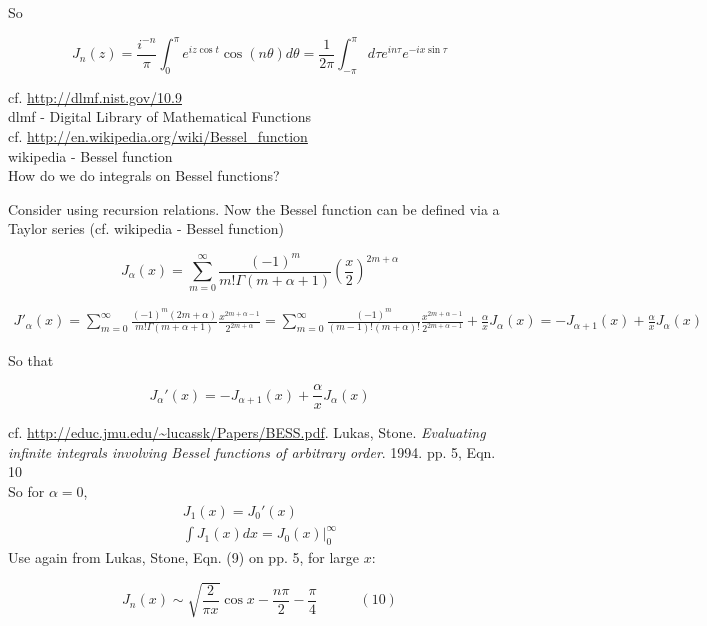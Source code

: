\documentclass[twoside]{amsart}
\begin{document}
So 

\[
\boxed{ J_n(z) = \frac{i^{-n} }{ \pi } \int_0^{\pi} e^{iz \cos{t}  } \cos{ (n \theta ) } d\theta = \frac{1}{2 \pi} \int_{-\pi}^{ \pi} d\tau e^{in\tau } e^{-ix \sin{\tau } } }
\]

cf. \url{ http://dlmf.nist.gov/10.9 } \\
dlmf - Digital Library of Mathematical Functions \\

cf. \url{http://en.wikipedia.org/wiki/Bessel_function} \\
wikipedia - Bessel function \\

How do we do integrals on Bessel functions?

Consider using recursion relations.  Now the Bessel function can be defined via a Taylor series (cf. wikipedia - Bessel function)

\[
J_{\alpha}(x)  = \sum_{m=0}^{\infty} \frac{ (-1)^m }{ m! \Gamma{ (m+ \alpha + 1 ) } } \left( \frac{x}{2} \right)^{ 2m + \alpha }
\]

\[
\begin{gathered}
  J'_{\alpha}(x) = \sum_{m=0}^{\infty} \frac{ (-1)^m  ( 2m+ \alpha ) }{ m! \Gamma{ (m+\alpha + 1) } } \frac{ x^{2m + \alpha - 1 } }{ 2^{2m + \alpha } } = \sum_{m=0}^{\infty} \frac{ (-1)^m }{  (m-1)! (m+\alpha)! } \frac{x^{ 2m + \alpha - 1 }  }{ 2^{2m + \alpha - 1 } } + \frac{\alpha}{x} J_{\alpha}{(x)}  = -J_{\alpha + 1}(x) + \frac{\alpha}{x} J_{\alpha}(x)
\end{gathered}
\]

So that 

\[
\boxed{ J_{\alpha}'(x) = -J_{\alpha + 1}(x) + \frac{\alpha}{x} J_{\alpha}(x) }
\]

cf. \url{http://educ.jmu.edu/~lucassk/Papers/BESS.pdf}.  Lukas, Stone.  \emph{Evaluating infinite integrals involving Bessel functions of arbitrary order}. 1994. pp. 5, Eqn. 10 \\

So for $\alpha =0$, 
\[
\begin{gathered}
  J_1(x) = J_0'(x) \\ 
 \int J_1(x) dx = \left. J_0(x)  \right|_0^{\infty}
\end{gathered}
\]
Use again from Lukas, Stone, Eqn. (9) on pp. 5, for large $x$:

\begin{equation}
J_n{(x)} \sim  \sqrt{ \frac{2}{ \pi x } } \cos{  x - \frac{n \pi }{2} - \frac{\pi}{4} } \quad \quad \quad (10)
\end{equation}
\end{document}
